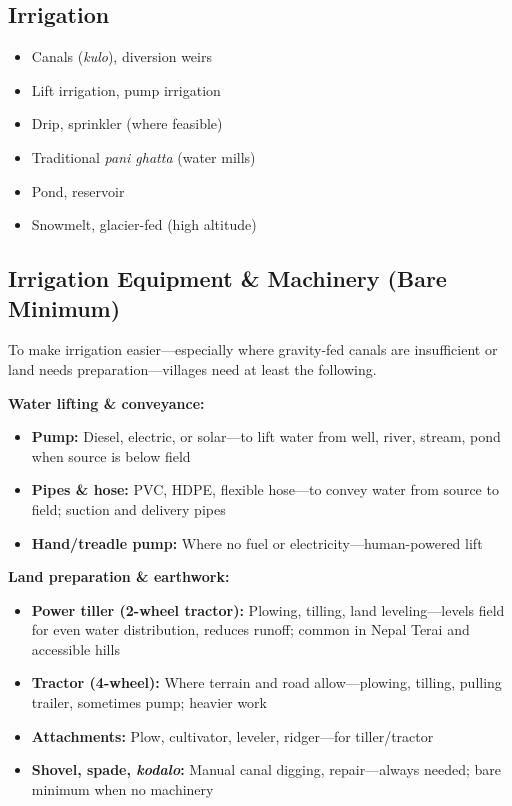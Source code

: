 \documentclass[11pt,a4paper]{article}
\begin{document}
\subsection{Irrigation}
\begin{itemize}
    \item Canals (\textit{kulo}), diversion weirs
    \item Lift irrigation, pump irrigation
    \item Drip, sprinkler (where feasible)
    \item Traditional \textit{pani ghatta} (water mills)
    \item Pond, reservoir
    \item Snowmelt, glacier-fed (high altitude)
\end{itemize}

\subsection{Irrigation Equipment \& Machinery (Bare Minimum)}
To make irrigation easier---especially where gravity-fed canals are insufficient or land needs preparation---villages need at least the following.

\textbf{Water lifting \& conveyance:}
\begin{itemize}
    \item \textbf{Pump:} Diesel, electric, or solar---to lift water from well, river, stream, pond when source is below field
    \item \textbf{Pipes \& hose:} PVC, HDPE, flexible hose---to convey water from source to field; suction and delivery pipes
    \item \textbf{Hand/treadle pump:} Where no fuel or electricity---human-powered lift
\end{itemize}

\textbf{Land preparation \& earthwork:}
\begin{itemize}
    \item \textbf{Power tiller (2-wheel tractor):} Plowing, tilling, land leveling---levels field for even water distribution, reduces runoff; common in Nepal Terai and accessible hills
    \item \textbf{Tractor (4-wheel):} Where terrain and road allow---plowing, tilling, pulling trailer, sometimes pump; heavier work
    \item \textbf{Attachments:} Plow, cultivator, leveler, ridger---for tiller/tractor
    \item \textbf{Shovel, spade, \textit{kodalo}:} Manual canal digging, repair---always needed; bare minimum when no machinery
\end{itemize}
\end{document}
